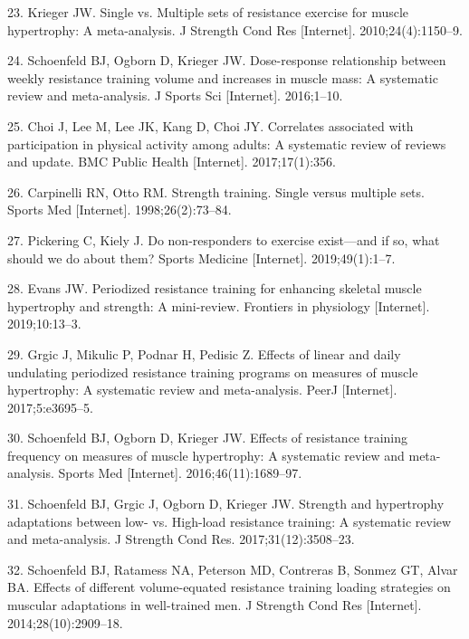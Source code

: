 \documentclass[twoside,10pt]{gihclass} %
\begin{document}
\leavevmode\hypertarget{ref-RN789}{}%
23. Krieger JW. Single vs. Multiple sets of resistance exercise for muscle hypertrophy: A meta-analysis. J Strength Cond Res {[}Internet{]}. 2010;24(4):1150--9.

\leavevmode\hypertarget{ref-RN1767}{}%
24. Schoenfeld BJ, Ogborn D, Krieger JW. Dose-response relationship between weekly resistance training volume and increases in muscle mass: A systematic review and meta-analysis. J Sports Sci {[}Internet{]}. 2016;1--10.

\leavevmode\hypertarget{ref-RN2063}{}%
25. Choi J, Lee M, Lee JK, Kang D, Choi JY. Correlates associated with participation in physical activity among adults: A systematic review of reviews and update. BMC Public Health {[}Internet{]}. 2017;17(1):356.

\leavevmode\hypertarget{ref-RN794}{}%
26. Carpinelli RN, Otto RM. Strength training. Single versus multiple sets. Sports Med {[}Internet{]}. 1998;26(2):73--84.

\leavevmode\hypertarget{ref-RN2547}{}%
27. Pickering C, Kiely J. Do non-responders to exercise exist---and if so, what should we do about them? Sports Medicine {[}Internet{]}. 2019;49(1):1--7.

\leavevmode\hypertarget{ref-RN2575}{}%
28. Evans JW. Periodized resistance training for enhancing skeletal muscle hypertrophy and strength: A mini-review. Frontiers in physiology {[}Internet{]}. 2019;10:13--3.

\leavevmode\hypertarget{ref-RN2572}{}%
29. Grgic J, Mikulic P, Podnar H, Pedisic Z. Effects of linear and daily undulating periodized resistance training programs on measures of muscle hypertrophy: A systematic review and meta-analysis. PeerJ {[}Internet{]}. 2017;5:e3695--5.

\leavevmode\hypertarget{ref-RN2571}{}%
30. Schoenfeld BJ, Ogborn D, Krieger JW. Effects of resistance training frequency on measures of muscle hypertrophy: A systematic review and meta-analysis. Sports Med {[}Internet{]}. 2016;46(11):1689--97.

\leavevmode\hypertarget{ref-RN2569}{}%
31. Schoenfeld BJ, Grgic J, Ogborn D, Krieger JW. Strength and hypertrophy adaptations between low- vs. High-load resistance training: A systematic review and meta-analysis. J Strength Cond Res. 2017;31(12):3508--23.

\leavevmode\hypertarget{ref-RN1612}{}%
32. Schoenfeld BJ, Ratamess NA, Peterson MD, Contreras B, Sonmez GT, Alvar BA. Effects of different volume-equated resistance training loading strategies on muscular adaptations in well-trained men. J Strength Cond Res {[}Internet{]}. 2014;28(10):2909--18.
\end{document}
